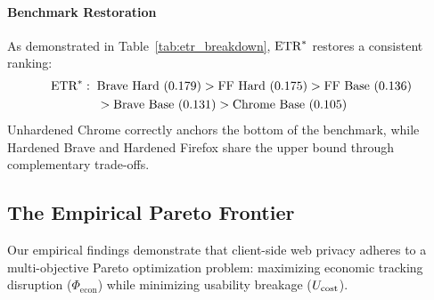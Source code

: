 \paragraph{Benchmark Restoration}
As demonstrated in Table~\ref{tab:etr_breakdown}, $\text{ETR}^*$ restores a consistent ranking:
\begin{align*}
\text{ETR}^*: \;\; & \text{Brave Hard (0.179)} > \text{FF Hard (0.175)} > \text{FF Base (0.136)} \\
& > \text{Brave Base (0.131)} > \text{Chrome Base (0.105)}
\end{align*}
Unhardened Chrome correctly anchors the bottom of the benchmark, while Hardened Brave and Hardened Firefox share the upper bound through complementary trade-offs.

\subsection{The Empirical Pareto Frontier}
\label{subsec:pareto_frontier}

Our empirical findings demonstrate that client-side web privacy adheres to a multi-objective Pareto optimization problem: maximizing economic tracking disruption ($\Phi_{\text{econ}}$) while minimizing usability breakage ($U_{\text{cost}}$).

